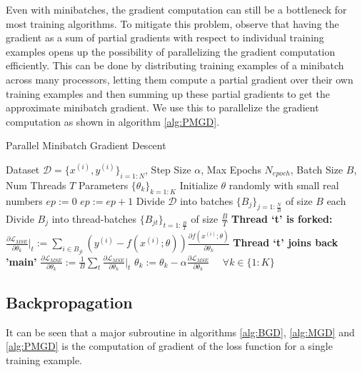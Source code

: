 Even with minibatches, the gradient computation can still be a bottleneck for most training algorithms.
To mitigate this problem, observe that having the gradient as a sum of partial gradients with respect to individual training examples opens up the possibility of parallelizing the gradient computation efficiently.
This can be done by distributing training examples of a minibatch across many processors, letting them compute a partial gradient over their own training examples and then summing up these partial gradients to get the approximate minibatch gradient.
We use this to parallelize the gradient computation as shown in algorithm \ref{alg:PMGD}.
\begin{algorithm}[tb]
   \caption{Parallel Minibatch Gradient Descent}
   \label{alg:PMGD}
\begin{algorithmic}
    Dataset $\mathcal{D} = \{x^{(i)},y^{(i)}\}_{i=1:N}$, Step Size $\alpha$, Max Epochs $N_{epoch}$, Batch Size $B$, Num Threads $T$
    Parameters $\{\theta_k\}_{k=1:K}$
   \STATE
   \STATE Initialize $\theta$ randomly with small real numbers
   \STATE $ep := 0$
   \REPEAT
   \STATE $ep := ep + 1$
   \STATE Divide $\mathcal{D}$ into batches $\{B_j\}_{j=1:\frac{N}{B}}$ of size $B$ each
   \STATE Divide $B_j$ into thread-batches $\{B_{jt}\}_{t=1:\frac{B}{T}}$ of size $\frac{B}{T}$
   \STATE \textbf{Thread `t' is forked:}
   \STATE $\frac{\partial \mathcal{L}_{MSE}}{\partial \theta_k} \big|_t := \sum_{i \in B_{jt}} ( y^{(i)} - f(x^{(i)}; \theta)) \frac{\partial f(x^{(i)}; \theta)}{\partial \theta_k}$
   \ENDFOR
   \STATE \textbf{Thread `t' joins back 'main'}
   \STATE $\frac{\partial \mathcal{L}_{MSE}}{\partial \theta_k} := \frac{1}{B} \sum_t \frac{\partial \mathcal{L}_{MSE}}{\partial \theta_k} \big|_t$
   \ENDFOR
   \STATE $\theta_k := \theta_k - \alpha \frac{\partial \mathcal{L}_{MSE}}{\partial \theta_k} \hspace{16pt} \forall k \in \{1:K\}$
   \ENDFOR
\end{algorithmic}
\end{algorithm}

\subsection{Backpropagation}
\label{sub:BackProp}

It can be seen that a major subroutine in algorithms \ref{alg:BGD}, \ref{alg:MGD} and \ref{alg:PMGD} is the computation of gradient of the loss function for a single training example.

